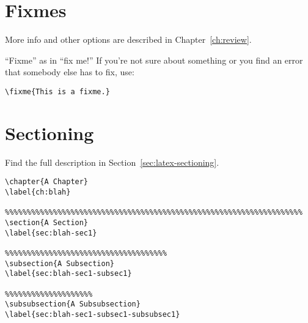 \section{Fixmes}
More info and other options are described in Chapter~\ref{ch:review}.

\begin{framed}
``Fixme'' as in ``fix me!'' If you're not sure about something or you find an error that somebody else has to fix, use:
\begin{verbatim}
\fixme{This is a fixme.}
\end{verbatim}
\end{framed}

\section{Sectioning}

\begin{framed}
Find the full description in Section~\ref{sec:latex-sectioning}.
\begin{verbatim}
\chapter{A Chapter}
\label{ch:blah}

%%%%%%%%%%%%%%%%%%%%%%%%%%%%%%%%%%%%%%%%%%%%%%%%%%%%%%%%%%%%%%%%%%%%
\section{A Section}
\label{sec:blah-sec1}

%%%%%%%%%%%%%%%%%%%%%%%%%%%%%%%%%%%%%
\subsection{A Subsection}
\label{sec:blah-sec1-subsec1}

%%%%%%%%%%%%%%%%%%%%
\subsubsection{A Subsubsection}
\label{sec:blah-sec1-subsec1-subsubsec1}
\end{verbatim}
\end{framed}
